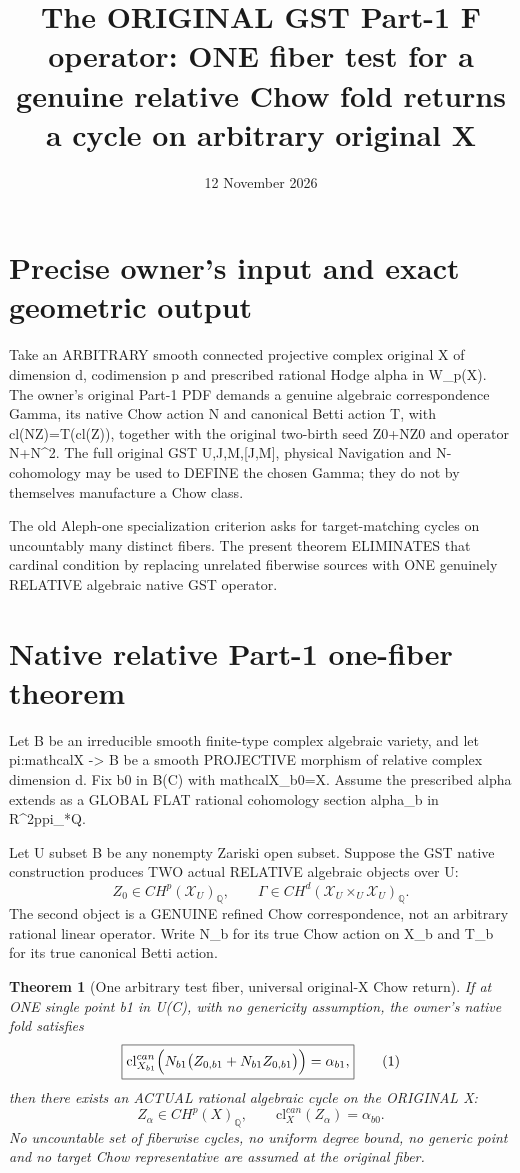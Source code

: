 \documentclass[11pt]{article}
\title{The ORIGINAL GST Part-1 F operator: ONE fiber test for a genuine relative Chow fold returns a cycle on arbitrary original X}
\date{12 November 2026}
\newtheorem{theorem}{Theorem}
\begin{document}
\maketitle

\section{Precise owner's input and exact geometric output}
Take an ARBITRARY smooth connected projective complex original
X of dimension d, codimension p and prescribed rational
Hodge alpha in W_p(X). The owner's original Part-1 PDF
demands a genuine algebraic correspondence Gamma,
its native Chow action N and canonical Betti action T,
with cl(NZ)=T(cl(Z)), together with the original
two-birth seed Z0+NZ0 and operator N+N^2.
The full original GST U,J,M,[J,M], physical Navigation
and N-cohomology may be used to DEFINE the chosen Gamma;
they do not by themselves manufacture a Chow class.

The old Aleph-one specialization criterion asks for
target-matching cycles on uncountably many distinct fibers.
The present theorem ELIMINATES that cardinal condition
by replacing unrelated fiberwise sources with ONE
genuinely RELATIVE algebraic native GST operator.

\section{Native relative Part-1 one-fiber theorem}
Let B be an irreducible smooth finite-type complex
algebraic variety, and let
pi:mathcalX -> B be a smooth PROJECTIVE
morphism of relative complex dimension d.
Fix b0 in B(C) with mathcalX_b0=X.
Assume the prescribed alpha extends as a
GLOBAL FLAT rational cohomology section
alpha_b in R^{2p}pi_*Q.

Let U subset B be any nonempty Zariski open subset.
Suppose the GST native construction produces
TWO actual RELATIVE algebraic objects over U:
\[
Z_0\in CH^p(\mathcal X_U)_{\mathbb Q},
\qquad
\Gamma\in CH^d(
\mathcal X_U\times_U\mathcal X_U)_{\mathbb Q}.
\]
The second object is a GENUINE refined Chow correspondence,
not an arbitrary rational linear operator.
Write N_b for its true Chow action on X_b
and T_b for its true canonical Betti action.

\begin{theorem}[One arbitrary test fiber, universal original-X Chow return]
If at ONE single point b1 in U(C), with no
genericity assumption, the owner's native fold satisfies
\[
\boxed{
\mathrm{cl}^{can}_{X_{b1}}
\Bigl(N_{b1}\bigl(Z_{0,b1}
               +N_{b1}Z_{0,b1}\bigr)\Bigr)
=\alpha_{b1},
}\tag{1}
\]
then there exists an ACTUAL rational
algebraic cycle on the ORIGINAL X:
\[
\boxed{
Z_\alpha\in CH^p(X)_{\mathbb Q},
\qquad
\mathrm{cl}^{can}_X(Z_\alpha)=\alpha_{b0}.
}\tag{2}
\]
No uncountable set of fiberwise cycles,
no uniform degree bound, no generic point
and no target Chow representative are
assumed at the original fiber.
\end{theorem}
\end{document}
